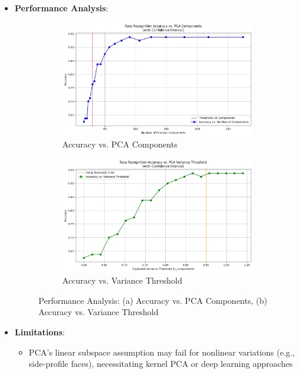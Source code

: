 \documentclass{article}
\begin{document}
\begin{itemize}
		\item \textbf{Performance Analysis}:
		\begin{figure}[h!]
			\centering
			\begin{subfigure}{0.55\textwidth}
				\centering
				\includegraphics[width=0.9\linewidth]{Face Recognition Accuracy vs. PCA components.png}
				\caption{Accuracy vs. PCA Components}
				\label{fig:accuracy_k_sub1}
			\end{subfigure}
			\hfill
			\begin{subfigure}{0.55\textwidth}
				\centering
				\includegraphics[width=0.9\linewidth]{Facial Recognition Accuracy vs. PCA Variance Threshold.png}
				\caption{Accuracy vs. Variance Threshold}
				\label{fig:accuracy_k_sub2}
			\end{subfigure}
			\caption{Performance Analysis: (a) Accuracy vs. PCA Components, (b) Accuracy vs. Variance Threshold}
			\label{fig:accuracy_k}
		\end{figure}
		
		\item \textbf{Limitations}:
		\begin{itemize}
			\item PCA's linear subspace assumption may fail for nonlinear variations (e.g., side-profile faces), necessitating kernel PCA or deep learning approaches
		\end{itemize}
	\end{itemize}
	
\end{document}

